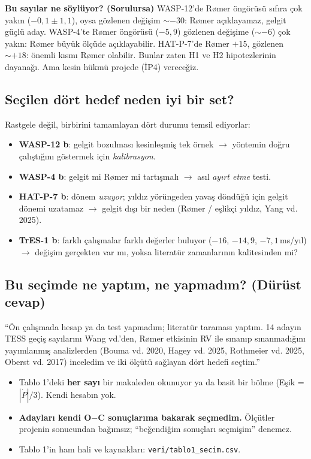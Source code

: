 \documentclass[11pt,a4paper]{article}
\newcommand{\OC}{O$-$C}
\newcommand{\Pdot}{\ensuremath{\dot{P}}}
\newcommand{\msyil}{\,ms/yıl}
\begin{document}
\textbf{Bu sayılar ne söylüyor? (Sorulursa)} WASP-12'de Rømer öngörüsü sıfıra çok yakın ($-0{,}1\pm1{,}1$), oysa gözlenen değişim $\sim-30$: Rømer açıklayamaz, gelgit güçlü aday. WASP-4'te Rømer öngörüsü ($-5{,}9$) gözlenen değişime ($\sim-6$) çok yakın: Rømer büyük ölçüde açıklayabilir. HAT-P-7'de Rømer $+15$, gözlenen $\sim+18$: önemli kısmı Rømer olabilir. Bunlar zaten H1 ve H2 hipotezlerinin dayanağı. Ama kesin hükmü projede (İP4) vereceğiz.

\subsection{Seçilen dört hedef neden iyi bir set?}
Rastgele değil, birbirini tamamlayan dört durumu temsil ediyorlar:
\begin{itemize}
\item \textbf{WASP-12 b}: gelgit bozulması kesinleşmiş tek örnek $\rightarrow$ yöntemin doğru çalıştığını göstermek için \emph{kalibrasyon}.
\item \textbf{WASP-4 b}: gelgit mi Rømer mi tartışmalı $\rightarrow$ asıl \emph{ayırt etme} testi.
\item \textbf{HAT-P-7 b}: dönem \emph{uzuyor}; yıldız yörüngeden yavaş döndüğü için gelgit dönemi uzatamaz $\rightarrow$ gelgit dışı bir neden (Rømer / eşlikçi yıldız, Yang vd. 2025).
\item \textbf{TrES-1 b}: farklı çalışmalar farklı değerler buluyor ($-16$, $-14{,}9$, $-7{,}1$\msyil) $\rightarrow$ değişim gerçekten var mı, yoksa literatür zamanlarının kalitesinden mi?
\end{itemize}

\subsection{Bu seçimde ne yaptım, ne yapmadım? (Dürüst cevap)}
\begin{soyle}
``Ön çalışmada hesap ya da test yapmadım; literatür taraması yaptım. 14 adayın TESS geçiş sayılarını Wang vd.'den, Rømer etkisinin RV ile sınanıp sınanmadığını yayımlanmış analizlerden (Bouma vd. 2020, Hagey vd. 2025, Rothmeier vd. 2025, Oberst vd. 2017) inceledim ve iki ölçütü sağlayan dört hedefi seçtim.''
\end{soyle}
\begin{itemize}
\item Tablo 1'deki \textbf{her sayı} bir makaleden okunuyor ya da basit bir bölme (Eşik = $|\Pdot|/3$). Kendi hesabın yok.
\item \textbf{Adayları kendi \OC{} sonuçlarıma bakarak seçmedim.} Ölçütler projenin sonucundan bağımsız; ``beğendiğim sonuçları seçmişim'' denemez.
\item Tablo 1'in ham hali ve kaynakları: \texttt{veri/tablo1\_secim.csv}.
\end{itemize}
\end{document}
